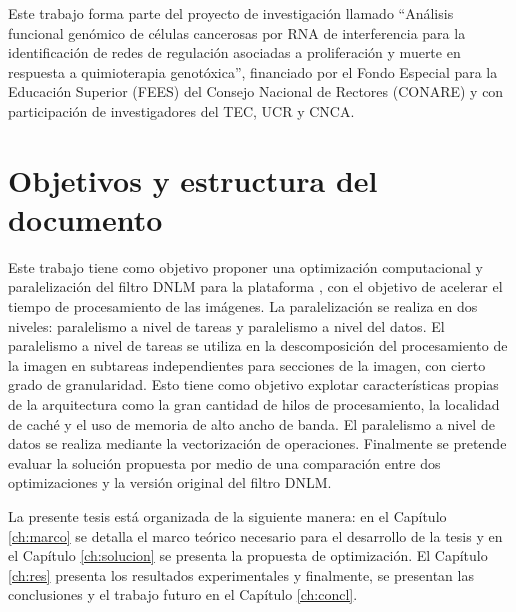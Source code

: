 Este trabajo forma parte del proyecto de investigación llamado ``Análisis funcional genómico de células cancerosas por RNA de interferencia para la identificación de redes de regulación asociadas a proliferación y muerte en respuesta a quimioterapia genotóxica'', financiado por el Fondo Especial para la Educación Superior (FEES) del Consejo Nacional de Rectores (CONARE) y con participación de investigadores del TEC, UCR y CNCA. 


\section{Objetivos y estructura del documento}


Este trabajo tiene como objetivo proponer una optimización computacional y paralelización del filtro DNLM  para la plataforma , con el objetivo de acelerar el tiempo de procesamiento de las imágenes. La paralelización se realiza en dos niveles: paralelismo a nivel de tareas y paralelismo a nivel del datos. El paralelismo a nivel de tareas se utiliza en la descomposición del procesamiento de la imagen en subtareas independientes para secciones de la imagen, con cierto grado de granularidad. Esto tiene como objetivo explotar características propias de la arquitectura como la gran cantidad de hilos de procesamiento, la localidad de caché y el uso de memoria de alto ancho de banda. El paralelismo a nivel de datos se realiza mediante la vectorización de operaciones. Finalmente se pretende evaluar la solución propuesta por medio de una comparación entre dos optimizaciones y la versión original del filtro DNLM.


La presente tesis está organizada de la siguiente manera: en el Capítulo \ref{ch:marco} se detalla el marco teórico necesario para el desarrollo de la tesis y en el Capítulo \ref{ch:solucion} se presenta la propuesta de optimización. El Capítulo \ref{ch:res} presenta los resultados experimentales y finalmente, se presentan las conclusiones y el trabajo futuro en el Capítulo \ref{ch:concl}. 
